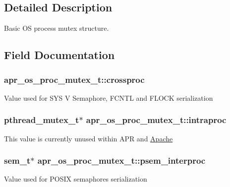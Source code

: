 \subsection{Detailed Description}
Basic OS process mutex structure. 

\subsection{Field Documentation}
\subsubsection[{\texorpdfstring{crossproc}{crossproc}}]{ apr\+\_\+os\+\_\+proc\+\_\+mutex\+\_\+t\+::crossproc}\hypertarget{structapr__os__proc__mutex__t_ab75e29a654ba0ff0dc491b625308fb79}{}\label{structapr__os__proc__mutex__t_ab75e29a654ba0ff0dc491b625308fb79}
Value used for S\+YS V Semaphore, F\+C\+N\+TL and F\+L\+O\+CK serialization 
\subsubsection[{\texorpdfstring{intraproc}{intraproc}}]{\setlength{\rightskip}{0pt plus 5cm}pthread\+\_\+mutex\+\_\+t$\ast$ apr\+\_\+os\+\_\+proc\+\_\+mutex\+\_\+t\+::intraproc}\hypertarget{structapr__os__proc__mutex__t_aa2e01fa37b652185a0dd3fae80caa4ad}{}\label{structapr__os__proc__mutex__t_aa2e01fa37b652185a0dd3fae80caa4ad}
This value is currently unused within A\+PR and \hyperlink{namespaceApache}{Apache} 
\subsubsection[{\texorpdfstring{psem\+\_\+interproc}{psem_interproc}}]{\setlength{\rightskip}{0pt plus 5cm}sem\+\_\+t$\ast$ apr\+\_\+os\+\_\+proc\+\_\+mutex\+\_\+t\+::psem\+\_\+interproc}\hypertarget{structapr__os__proc__mutex__t_ac109ebd758cb6aaa466a8e71cbeed56c}{}\label{structapr__os__proc__mutex__t_ac109ebd758cb6aaa466a8e71cbeed56c}
Value used for P\+O\+S\+IX semaphores serialization 
